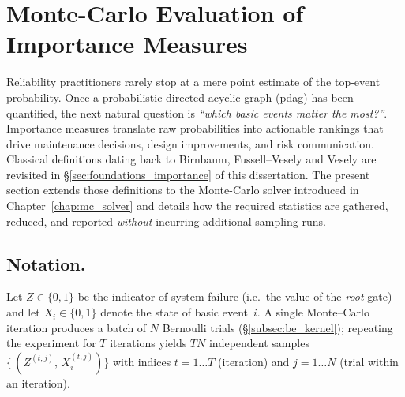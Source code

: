 \chapter{Monte-Carlo Evaluation of Importance Measures}
\label{sec:mc_importance_measures}

Reliability practitioners rarely stop at a mere point estimate of the top‐event
probability.  Once a probabilistic directed acyclic graph (\acrshort{pdag}) has
been quantified, the next natural question is 
\emph{``which basic events matter the most?''}.  Importance measures translate
raw probabilities into actionable rankings that drive maintenance decisions,
design improvements, and risk communication.  Classical definitions dating back
to Birnbaum, Fussell--Vesely and Vesely are revisited in
\S\ref{sec:foundations_importance} of this dissertation.  The present section
extends those definitions to the Monte-Carlo solver introduced in
Chapter~\ref{chap:mc_solver} and details how the required statistics are
gathered, reduced, and reported \emph{without} incurring additional sampling
runs.

\section*{Notation.}  Let $Z\in\{0,1\}$ be the indicator of system failure
(i.e.~the value of the \emph{root} gate) and let $X_i\in\{0,1\}$ denote the
state of basic event~$i$.
A single Monte–Carlo iteration produces a batch of $N$ Bernoulli trials
(\S\ref{subsec:be_kernel}); repeating the experiment for $T$ iterations yields
$T N$ 
independent samples $\bigl\{\,(Z^{(t,j)},\,X_i^{(t,j)})\bigr\}$ with indices
$t\!=\!1\dots T$ (iteration) and $j\!=\!1\dots N$ (trial within an
iteration).

